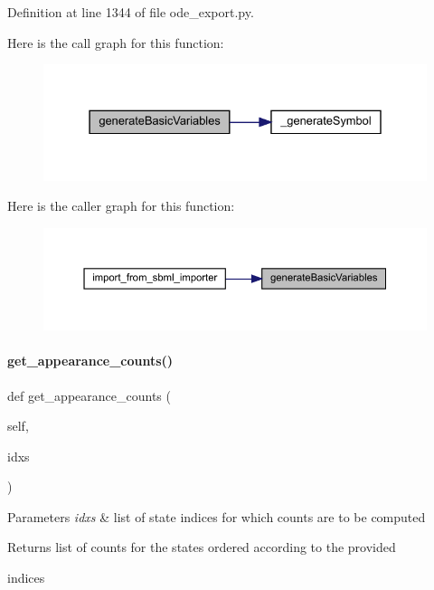 Definition at line 1344 of file ode\+\_\+export.\+py.

Here is the call graph for this function\+:
\nopagebreak
\begin{figure}[H]
\begin{center}
\leavevmode
\includegraphics[width=331pt]{classamici_1_1ode__export_1_1_o_d_e_model_af3b774d51a546704413dc57f93dc427d_cgraph}
\end{center}
\end{figure}
Here is the caller graph for this function\+:
\nopagebreak
\begin{figure}[H]
\begin{center}
\leavevmode
\includegraphics[width=350pt]{classamici_1_1ode__export_1_1_o_d_e_model_af3b774d51a546704413dc57f93dc427d_icgraph}
\end{center}
\end{figure}
\mbox{\label{classamici_1_1ode__export_1_1_o_d_e_model_a5e124f15318e0b6217db8290b3bbe3b4}} 
\paragraph{\texorpdfstring{get\_appearance\_counts()}{get\_appearance\_counts()}}
{\footnotesize\ttfamily def get\+\_\+appearance\+\_\+counts (\begin{DoxyParamCaption}\item[{}]{self,  }\item[{}]{idxs }\end{DoxyParamCaption})}


\begin{DoxyParams}{Parameters}
{\em idxs} & list of state indices for which counts are to be computed\\
\hline
\end{DoxyParams}
\begin{DoxyReturn}{Returns}
list of counts for the states ordered according to the provided 

indices 
\end{DoxyReturn}


